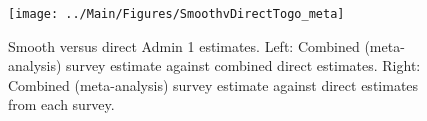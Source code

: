 \documentclass[12pt]{article}\usepackage[]{graphicx}\usepackage[]{color}
\newenvironment{knitrout}{}{} %
\begin{document}



\begin{knitrout}
\color{fgcolor}\begin{figure}[bht]

{\centering \texttt{[image: ../Main/Figures/SmoothvDirectTogo\_meta]} 

}

\caption[Smooth versus direct Admin 1 estimates]{Smooth versus direct Admin 1 estimates. Left: Combined (meta-analysis) survey estimate against combined direct estimates. Right: Combined (meta-analysis) survey estimate against direct estimates from each survey.}\label{fig:unnamed-chunk-313}
\end{figure}


\end{knitrout}
\end{document}
